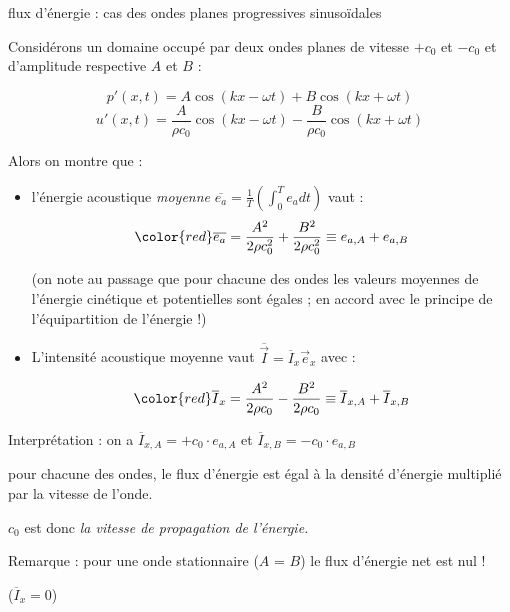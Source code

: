 \begin{frame}{flux d'énergie : cas des ondes planes progressives sinusoïdales}
\small

Considérons un domaine occupé par deux ondes planes de vitesse $+c_0$ et $-c_0$ et 
d'amplitude respective $A$ et $B$ :
 
$$
p'(x,t) = A \cos (k x - \omega t) + B \cos (kx + \omega t) 
$$
$$
u'(x,t) = \frac{A}{\rho c_0}  \cos (k x - \omega t) - \frac{B}{\rho c_0} \cos (kx + \omega t)
$$

\pause
Alors on montre que :

\begin{itemize}
\item l'énergie acoustique {\em moyenne } $\overline{e_a} = \frac{1}{T} (\int_0^T e_a dt)$ vaut :
$$
\color{red} \overline{e_a} = \frac{A^2}{2 \rho c_0^2}  +  \frac{B^2}{2 \rho c_0^2} \equiv e_{a,A} + e_{a,B}
$$

(on note au passage que pour chacune des ondes les valeurs moyennes 
de l'énergie cinétique et potentielles sont égales ; en accord avec le principe de l'équipartition de l'énergie !)

\pause 
\item L'intensité acoustique moyenne vaut $\overline{ \vec{ I}} = \overline{I}_x \vec e_x$ avec :
  
$$
\color{red} \overline{I}_x = \frac{A^2}{2 \rho c_0}  -  \frac{B^2}{2 \rho c_0} 
\equiv \overline{I}_{x,A}  +  \overline{I}_{x,B} 
$$
\end{itemize}

Interprétation : on a $ \overline{I}_{x,A} =+ c_0 \cdot e_{a,A}   $ et $ \overline{I}_{x,B} =- c_0 \cdot e_{a,B}   $

pour chacune des ondes, le flux d'énergie est égal à la densité d'énergie multiplié par la vitesse de l'onde.

$c_0$ est donc {\em la vitesse de propagation de l'énergie.}


\pause

Remarque : pour une onde stationnaire ($A$ = $B$) le flux d'énergie net est nul ! 

($\overline{I}_x = 0$)
 


\vspace{0mm}
\end{frame}



